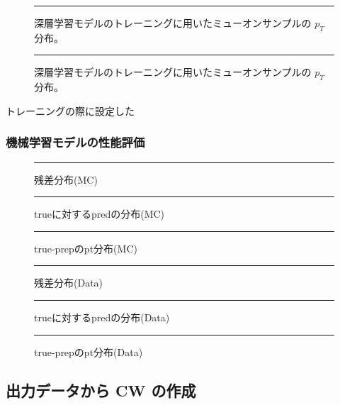 \begin{figure}[tb]
  \centering
  \rule{8cm}{6cm}
  \caption{深層学習モデルのトレーニングに用いたミューオンサンプルの $p_T$ 分布。}
  \label{fig:mu_pt_forMC}
\end{figure}

\begin{figure}[tb]
  \centering
  \rule{8cm}{6cm}
  \caption{深層学習モデルのトレーニングに用いたミューオンサンプルの $p_T$ 分布。}
  \label{fig:mu_pt_forData}
\end{figure}

トレーニングの際に設定した



\subsubsection{機械学習モデルの性能評価}



\begin{figure}[tb]
  \centering
  \rule{8cm}{6cm}
  \caption{残差分布(MC)}
  \label{fig:fit_def}
\end{figure}

\begin{figure}[tb]
  \centering
  \rule{8cm}{6cm}
  \caption{trueに対するpredの分布(MC)}
  \label{fig:fit_def}
\end{figure}

\begin{figure}[tb]
  \centering
  \rule{8cm}{6cm}
  \caption{true-prepのpt分布(MC)}
  \label{fig:fit_def}
\end{figure}

\begin{figure}[tb]
  \centering
  \rule{8cm}{6cm}
  \caption{残差分布(Data)}
  \label{fig:fit_def}
\end{figure}

\begin{figure}[tb]
  \centering
  \rule{8cm}{6cm}
  \caption{trueに対するpredの分布(Data)}
  \label{fig:fit_def}
\end{figure}

\begin{figure}[tb]
  \centering
  \rule{8cm}{6cm}
  \caption{true-prepのpt分布(Data)}
  \label{fig:fit_def}
\end{figure}


\subsection{出力データから CW の作成}

